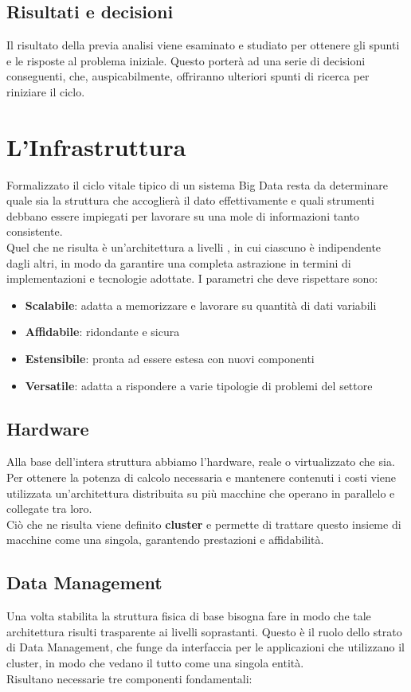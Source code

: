 \subsection{Risultati e decisioni}
Il risultato della previa analisi viene esaminato e studiato per ottenere gli spunti e le risposte al problema iniziale. Questo porterà ad una serie di decisioni conseguenti, che, auspicabilmente, offriranno ulteriori spunti di ricerca per riniziare il ciclo.

\pagebreak

\section{L'Infrastruttura}
Formalizzato il ciclo vitale tipico di un sistema Big Data resta da determinare quale sia la struttura che accoglierà il dato effettivamente e quali strumenti debbano essere impiegati per lavorare su una mole di informazioni tanto consistente.\\
Quel che ne risulta è un'architettura a livelli \cite{Marz:2015:BDP:2717065}, in cui ciascuno è indipendente dagli altri, in modo da garantire una completa astrazione in termini di implementazioni e tecnologie adottate. I parametri che deve rispettare sono: 
\begin{itemize}
	\item \textbf{Scalabile}: adatta a memorizzare e lavorare su quantità di dati variabili
	\item \textbf{Affidabile}: ridondante e sicura
	\item \textbf{Estensibile}: pronta ad essere estesa con nuovi componenti
	\item \textbf{Versatile}: adatta a rispondere a varie tipologie di problemi del settore
\end{itemize}

\subsection{Hardware}
Alla base dell'intera struttura abbiamo l'hardware, reale o virtualizzato che sia. Per ottenere la potenza di calcolo necessaria e mantenere contenuti i costi viene utilizzata un'architettura distribuita su più macchine che operano in parallelo e collegate tra loro.\\ 
Ciò che ne risulta viene definito \textbf{cluster} e permette di trattare questo insieme di macchine come una singola, garantendo prestazioni e affidabilità.

\subsection{Data Management}
Una volta stabilita la struttura fisica di base bisogna fare in modo che tale architettura risulti trasparente ai livelli soprastanti. Questo è il ruolo dello strato di Data Management, che funge da interfaccia per le applicazioni che utilizzano il cluster, in modo che vedano il tutto come una singola entità.\\
Risultano necessarie tre componenti fondamentali:

